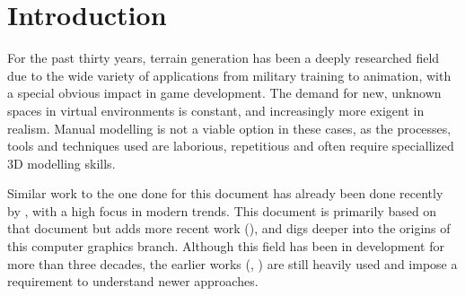 \documentclass{acmtog}
\begin{document}
\begin{abstract} 
\end{abstract}



\section{Introduction}
For the past thirty years, terrain generation has been a deeply researched field due to the wide variety of applications from military training to animation, with a special obvious impact in game development. The demand for new, unknown spaces in virtual environments is constant, and increasingly more exigent in realism. Manual modelling is not a viable option in these cases, as the processes, tools and techniques used are laborious, repetitious and often require speciallized 3D modelling skills.


Similar work to the one done for this document has already been done recently by \cite{Smelik09}, with a high focus in modern trends. This document is primarily based on that document but adds more recent work (\cite{Chen11}), and digs deeper into the origins of this computer graphics branch. Although this field has been in development for more than three decades, the earlier works (\cite{Fournier82}, \cite{Miller86}) are still heavily used and impose a requirement to understand newer approaches.
\end{document}
